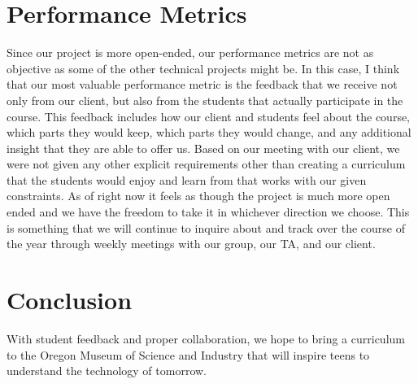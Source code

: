 \documentclass[10pt,a4paper,onecolumn,draftclsnofoot]{IEEEtran}
\begin{document}
\section*{Performance Metrics}
Since our project is more open-ended, our performance metrics are not as objective as some of the other technical projects might be. In this case, I think that our most valuable performance metric is the feedback that we receive not only from our client, but also from the students that actually participate in the course. This feedback includes how our client and students feel about the course, which parts they would keep, which parts they would change, and any additional insight that they are able to offer us. Based on our meeting with our client, we were not given any other explicit requirements other than creating a curriculum that the students would enjoy and learn from that works with our given constraints. As of right now it feels as though the project is much more open ended and we have the freedom to take it in whichever direction we choose. This is something that we will continue to inquire about and track over the course of the year through weekly meetings with our group, our TA, and our client.

\section*{Conclusion}
With student feedback and proper collaboration, we hope to bring a curriculum to the Oregon Museum of Science and Industry that will inspire teens to understand the technology of tomorrow.
\end{document}
